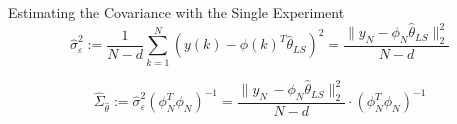 \begin{tcolorbox}[colback=red!5!white,colframe=red!75!black,title=\textbf{Example LLS}]
Estimating the Covariance with the Single Experiment
\begin{equation*}
\hat { \sigma  } _{ \varepsilon  }^{ 2 } := \frac { 1 }{ N-d } \sum _{ k=1 }^{ N }{ (y(k)-\phi (k)^{ T }\hat { \theta  } _{ LS })^{ 2 } }  = \frac { \parallel y_{ N }-\phi _{ N }\hat { \theta  } _{ LS }{ \parallel  }_{ 2 }^{ 2 } }{ N-d } 
\end{equation*}

\begin{equation*}
\hat { \Sigma  } _{ \hat { \theta  }  } := \hat { \sigma  } ^{ 2 }_{ \varepsilon  } (\phi ^{ T }_{ N } \phi _{ N })^{ -1 } = \frac { \parallel y_{ N }\, -\phi _{ N }\hat { \theta  } _{ LS }{ \parallel  }_{ 2 }^{ 2 } }{ N-d } \cdot (\phi ^{ T }_{ N } \phi _{ N })^{ -1 }
\end{equation*}
\end{tcolorbox}
